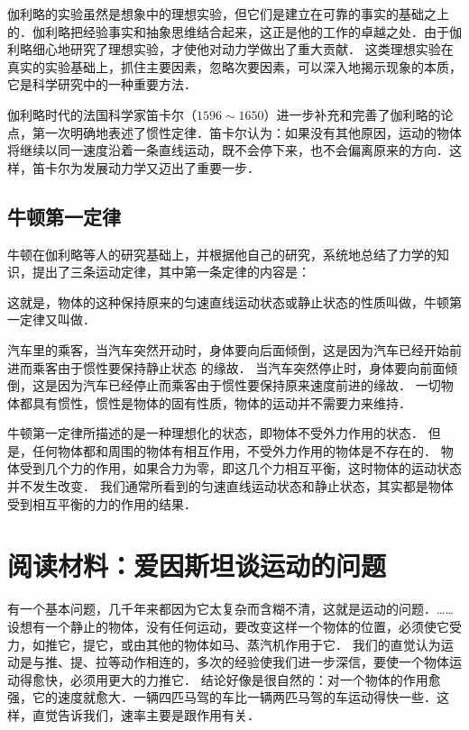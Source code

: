 伽利略的实验虽然是想象中的理想实验，但它们是建立在可靠的事实的基础之上的．伽利略把经验事实和抽象思维结合起来，这正是他的工作的卓越之处．由于伽利略细心地研究了理想实验，才使他对动力学做出了重大贡献．
这类理想实验在真实的实验基础上，抓住主要因素，忽略次要因素，可以深入地揭示现象的本质，它是科学研究中的一种重要方法．

伽利略时代的法国科学家笛卡尔（$1596 \sim 1650$）进一步补充和完善了伽利略的论点，第一次明确地表述了惯性定律．笛卡尔认为：如果没有其他原因，运动的物体将继续以同一速度沿着一条直线运动，既不会停下来，也不会偏离原来的方向．这样，笛卡尔为发展动力学又迈出了重要一步．

\subsection{牛顿第一定律} 
牛顿在伽利略等人的研究基础上，并根据他自己的研究，系统地总结了力学的知识，提出了三条运动定律，其中第一条定律的内容是：


这就是，物体的这种保持原来的匀速直线运动状态或静止状态的性质叫做，牛顿第一定律又叫做．

汽车里的乘客，当汽车突然开动时，身体要向后面倾倒，这是因为汽车已经开始前进而乘客由于惯性要保持静止状态
的缘故．
当汽车突然停止时，身体要向前面倾倒，这是因为汽车已经停止而乘客由于惯性要保持原来速度前进的缘故．
一切物体都具有惯性，惯性是物体的固有性质，物体的运动并不需要力来维持．

牛顿第一定律所描述的是一种理想化的状态，即物体不受外力作用的状态．
但是，任何物体都和周围的物体有相互作用，不受外力作用的物体是不存在的．
物体受到几个力的作用，如果合力为零，即这几个力相互平衡，这时物体的运动状态并不发生改变．
我们通常所看到的匀速直线运动状态和静止状态，其实都是物体受到相互平衡的力的作用的结果．

\section*{阅读材料：爱因斯坦谈运动的问题}
有一个基本问题，几千年来都因为它太复杂而含糊不清，这就是运动的问题．……设想有一个静止的物体，没有任何运动，要改变这样一个物体的位置，必须使它受力，如推它，提它，或由其他的物体如马、蒸汽机作用于它．
我们的直觉认为运动是与推、提、拉等动作相连的，多次的经验使我们进一步深信，要使一个物体运动得愈快，必须用更大的力推它．
结论好像是很自然的：对一个物体的作用愈强，它的速度就愈大．一辆四匹马驾的车比一辆两匹马驾的车运动得快一些．这样，直觉告诉我们，速率主要是跟作用有关．

